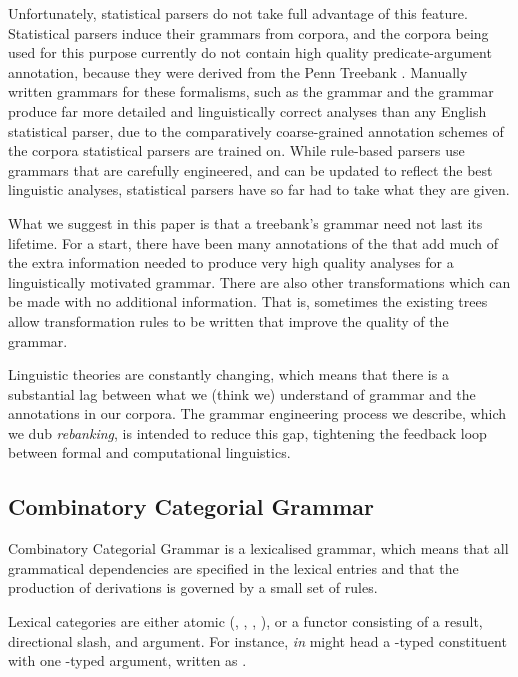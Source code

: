 \documentclass[11pt]{article}
\begin{document}
Unfortunately, statistical parsers do not take full advantage of this feature.
Statistical parsers induce their grammars from corpora, and the corpora being
used for this purpose currently do not contain high quality predicate-argument
annotation, because they were derived from the Penn Treebank
\citep[\penn][]{marcus:93}. Manually written grammars for these formalisms, such as the
\erg \hpsg grammar \citep{erg} and the \xle \lfg grammar \citep{xle} produce
far more detailed and linguistically correct analyses than any English
statistical parser, due to the comparatively coarse-grained annotation schemes of
the corpora statistical parsers are trained on. While rule-based parsers
use grammars that are carefully engineered, and can be updated to
reflect the best linguistic analyses, statistical parsers have so far had
to take what they are given.

What we suggest in this paper is that a treebank's grammar need not last its
lifetime. For a start, there have been many annotations of the \penn
that add much of the extra information needed to produce very high quality
analyses for a linguistically motivated grammar. There are also other
transformations which can be made with no additional information. That is,
sometimes the existing trees allow transformation rules to be written that
improve the quality of the grammar.

Linguistic theories are constantly changing, which means that there is a
substantial lag between what we (think we) understand of grammar and the
annotations in our corpora. The grammar engineering process we describe, which
we dub \emph{rebanking}, is intended to reduce this gap, tightening the
feedback loop between formal and computational linguistics.

\subsection{Combinatory Categorial Grammar}

Combinatory Categorial Grammar \citep[\ccg;][]{steedman:00}
is a lexicalised grammar, which means that all grammatical dependencies are
specified in the lexical entries and that the production of
derivations is governed by a small set of rules.

Lexical categories are either atomic (, , , ),
or a functor consisting of a result, directional slash, and argument.
For instance, \emph{in} might head a 
-typed constituent with one -typed argument, written as
.
\end{document}
